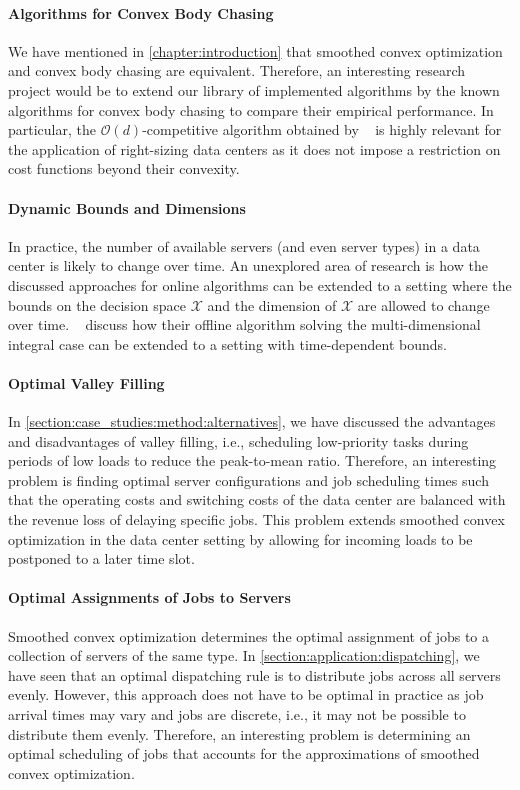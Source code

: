 \paragraph{Algorithms for Convex Body Chasing} We have mentioned in \autoref{chapter:introduction} that smoothed convex optimization and convex body chasing are equivalent. Therefore, an interesting research project would be to extend our library of implemented algorithms by the known algorithms for convex body chasing to compare their empirical performance. In particular, the $\mathcal{O}(d)$-competitive algorithm obtained by \citeauthor*{Argue2019}~\cite{Argue2019} is highly relevant for the application of right-sizing data centers as it does not impose a restriction on cost functions beyond their convexity.

\paragraph{Dynamic Bounds and Dimensions} In practice, the number of available servers (and even server types) in a data center is likely to change over time. An unexplored area of research is how the discussed approaches for online algorithms can be extended to a setting where the bounds on the decision space $\mathcal{X}$ and the dimension of $\mathcal{X}$ are allowed to change over time. \citeauthor*{Albers2021_2}~\cite{Albers2021_2} discuss how their offline algorithm solving the multi-dimensional integral case can be extended to a setting with time-dependent bounds.

\paragraph{Optimal Valley Filling} In \cref{section:case_studies:method:alternatives}, we have discussed the advantages and disadvantages of valley filling, i.e., scheduling low-priority tasks during periods of low loads to reduce the peak-to-mean ratio. Therefore, an interesting problem is finding optimal server configurations and job scheduling times such that the operating costs and switching costs of the data center are balanced with the revenue loss of delaying specific jobs. This problem extends smoothed convex optimization in the data center setting by allowing for incoming loads to be postponed to a later time slot.

\paragraph{Optimal Assignments of Jobs to Servers} Smoothed convex optimization determines the optimal assignment of jobs to a collection of servers of the same type. In \cref{section:application:dispatching}, we have seen that an optimal dispatching rule is to distribute jobs across all servers evenly. However, this approach does not have to be optimal in practice as job arrival times may vary and jobs are discrete, i.e., it may not be possible to distribute them evenly. Therefore, an interesting problem is determining an optimal scheduling of jobs that accounts for the approximations of smoothed convex optimization.

